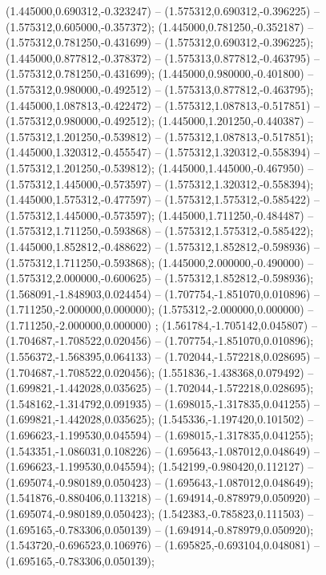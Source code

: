  (1.445000,0.690312,-0.323247) -- (1.575312,0.690312,-0.396225) -- (1.575312,0.605000,-0.357372);
 (1.445000,0.781250,-0.352187) -- (1.575312,0.781250,-0.431699) -- (1.575312,0.690312,-0.396225);
 (1.445000,0.877812,-0.378372) -- (1.575313,0.877812,-0.463795) -- (1.575312,0.781250,-0.431699);
 (1.445000,0.980000,-0.401800) -- (1.575312,0.980000,-0.492512) -- (1.575313,0.877812,-0.463795);
 (1.445000,1.087813,-0.422472) -- (1.575312,1.087813,-0.517851) -- (1.575312,0.980000,-0.492512);
 (1.445000,1.201250,-0.440387) -- (1.575312,1.201250,-0.539812) -- (1.575312,1.087813,-0.517851);
 (1.445000,1.320312,-0.455547) -- (1.575312,1.320312,-0.558394) -- (1.575312,1.201250,-0.539812);
 (1.445000,1.445000,-0.467950) -- (1.575312,1.445000,-0.573597) -- (1.575312,1.320312,-0.558394);
 (1.445000,1.575312,-0.477597) -- (1.575312,1.575312,-0.585422) -- (1.575312,1.445000,-0.573597);
 (1.445000,1.711250,-0.484487) -- (1.575312,1.711250,-0.593868) -- (1.575312,1.575312,-0.585422);
 (1.445000,1.852812,-0.488622) -- (1.575312,1.852812,-0.598936) -- (1.575312,1.711250,-0.593868);
 (1.445000,2.000000,-0.490000) -- (1.575312,2.000000,-0.600625) -- (1.575312,1.852812,-0.598936);
 (1.568091,-1.848903,0.024454) -- (1.707754,-1.851070,0.010896) -- (1.711250,-2.000000,0.000000);
 (1.575312,-2.000000,0.000000) -- (1.711250,-2.000000,0.000000) ;
 (1.561784,-1.705142,0.045807) -- (1.704687,-1.708522,0.020456) -- (1.707754,-1.851070,0.010896);
 (1.556372,-1.568395,0.064133) -- (1.702044,-1.572218,0.028695) -- (1.704687,-1.708522,0.020456);
 (1.551836,-1.438368,0.079492) -- (1.699821,-1.442028,0.035625) -- (1.702044,-1.572218,0.028695);
 (1.548162,-1.314792,0.091935) -- (1.698015,-1.317835,0.041255) -- (1.699821,-1.442028,0.035625);
 (1.545336,-1.197420,0.101502) -- (1.696623,-1.199530,0.045594) -- (1.698015,-1.317835,0.041255);
 (1.543351,-1.086031,0.108226) -- (1.695643,-1.087012,0.048649) -- (1.696623,-1.199530,0.045594);
 (1.542199,-0.980420,0.112127) -- (1.695074,-0.980189,0.050423) -- (1.695643,-1.087012,0.048649);
 (1.541876,-0.880406,0.113218) -- (1.694914,-0.878979,0.050920) -- (1.695074,-0.980189,0.050423);
 (1.542383,-0.785823,0.111503) -- (1.695165,-0.783306,0.050139) -- (1.694914,-0.878979,0.050920);
 (1.543720,-0.696523,0.106976) -- (1.695825,-0.693104,0.048081) -- (1.695165,-0.783306,0.050139);
